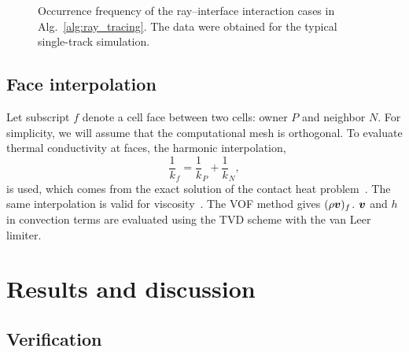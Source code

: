 \documentclass[final]{elsarticle} %
\newcommand{\bv}{\vb*{v}}
\begin{document}
\begin{figure}
    \centering
    \footnotesize
    \caption{
        Occurrence frequency of the ray--interface interaction cases in Alg.~\ref{alg:ray_tracing}.
        The data were obtained for the typical single-track simulation.
    }
    \label{fig:case_frequency}
\end{figure}

\subsection{Face interpolation}

Let subscript $f$ denote a cell face between two cells: owner $P$ and neighbor $N$.
For simplicity, we will assume that the computational mesh is orthogonal.
To evaluate thermal conductivity at faces, the harmonic interpolation,
\begin{equation}\label{eq:k_harmonic}
    \frac1k_f = \frac1k_P + \frac1k_N,
\end{equation}
is used, which comes from the exact solution of the contact heat problem~\cite{fedorenko1975difference,patankar1980numerical}.
The same interpolation is valid for viscosity~\cite{kothe1998perspective}.
The VOF method gives $(\rho\bv)_f$.
$\bv$ and $h$ in convection terms are evaluated using the TVD scheme with the van Leer limiter.


\section{Results and discussion}

\subsection{Verification}
\end{document}
